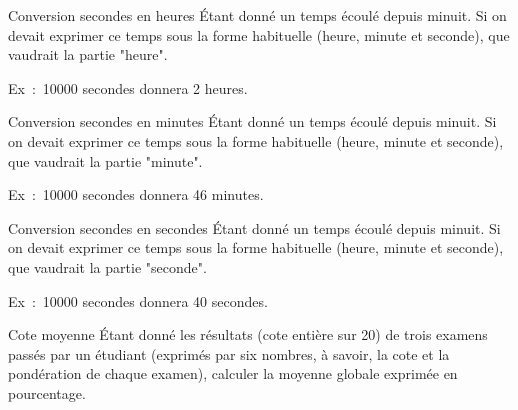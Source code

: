 		\begin{Exercice}{Conversion secondes en heures}
			Étant donné un temps écoulé depuis minuit.
			Si on devait exprimer ce temps sous la forme
			habituelle (heure, minute et seconde),
			que vaudrait la partie "heure".
	
			Ex~:~10000 secondes donnera 2 heures.
		\end{Exercice}
	
		\begin{Exercice}{Conversion secondes en minutes}
			Étant donné un temps écoulé depuis minuit.
			Si on devait exprimer ce temps sous la forme
			habituelle (heure, minute et seconde),
			que vaudrait la partie "minute".
	
			Ex~:~10000 secondes donnera 46 minutes.
		\end{Exercice}
	
		\begin{Exercice}{Conversion secondes en secondes}
			Étant donné un temps écoulé depuis minuit.
			Si on devait exprimer ce temps sous la forme
			habituelle (heure, minute et seconde),
			que vaudrait la partie "seconde".
	
			Ex~:~10000 secondes donnera 40 secondes.
		\end{Exercice}	
	
		\begin{Exercice}{Cote moyenne}
			Étant donné les résultats (cote entière sur
			20) de trois examens passés par un étudiant (exprimés par six nombres,
			à savoir, la cote et la pondération de chaque examen), calculer 
			la moyenne globale exprimée en pourcentage.
		\end{Exercice}
